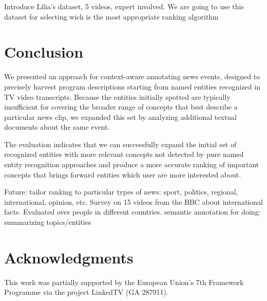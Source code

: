 \documentclass{llncs}
\begin{document}
Introduce Lilia's dataset, 5 videos, expert involved. We are going to use this dataset for selecting wich is the most appropriate ranking algorithm


\section{Conclusion}
\label{sec:conclusion}
We presented an approach for context-aware annotating news events, designed to precisely harvest program descriptions starting from named entities recognized in TV video transcripts. Because the entities initially spotted are typically insufficient for covering the broader range of concepts that best describe a particular news clip, we expanded this set by analyzing additional textual documents about the same event.

The evaluation indicates that we can successfully expand the initial set of recognized entities with more relevant concepts not detected by pure named entity recognition approaches and produce a more accurate ranking of important concepts that brings forward entities which user are more interested about.

Future: tailor ranking to particular types of news: sport, politics, regional, international, opinion, etc. Survey on 15 videos from the BBC about international facts. Evaluated over people in different countries.
semantic annotation for doing: summarizing topics/entities



\section*{Acknowledgments}
This work was partially supported by the European Union's 7th Framework Programme via the project LinkedTV (GA 287911).



\end{document}
